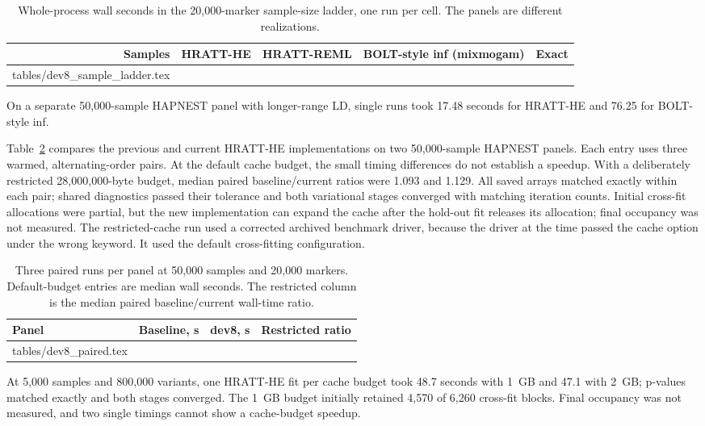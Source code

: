 \documentclass[11pt]{article}
\makeatletter
\newcommand{\tabinput}[1]{\@@input #1 }
\makeatother
\begin{document}
\begin{table}[htbp]
 \centering\small
 \caption{Whole-process wall seconds in the 20,000-marker sample-size
 ladder, one run per cell. The panels are different realizations.}
 \label{tab:dev8-ladder}
 \begin{tabular}{@{}rrrrr@{}}
 \toprule
 Samples & HRATT-HE & HRATT-REML & BOLT-style inf (mixmogam) & Exact \\
 \midrule
 \tabinput{tables/dev8_sample_ladder.tex}
 \bottomrule
 \end{tabular}
\end{table}

On a separate 50,000-sample HAPNEST panel with longer-range LD, single
runs took 17.48 seconds for HRATT-HE and 76.25 for BOLT-style inf.

Table~\ref{tab:dev8-paired} compares the previous and current HRATT-HE
implementations on two 50,000-sample HAPNEST panels. Each entry uses three
warmed, alternating-order pairs. At the default cache budget, the small
timing differences do not establish a speedup. With a deliberately
restricted 28,000,000-byte budget, median paired baseline/current ratios
were 1.093 and 1.129. All saved arrays matched exactly within each pair;
shared diagnostics passed their tolerance and both variational stages
converged with matching iteration counts. Initial cross-fit allocations
were partial, but the new implementation can expand the cache after the
hold-out fit releases its allocation; final occupancy was not measured.
The restricted-cache run used a corrected archived benchmark driver,
because the driver at the time passed the cache option under the wrong
keyword. It used the default cross-fitting configuration.

\begin{table}[htbp]
 \centering\small
 \caption{Three paired runs per panel at 50,000 samples and 20,000
 markers. Default-budget entries are median wall seconds. The restricted
 column is the median paired baseline/current wall-time ratio.}
 \label{tab:dev8-paired}
 \begin{tabular}{@{}lrrr@{}}
 \toprule
 Panel & Baseline, s & dev8, s & Restricted ratio \\
 \midrule
 \tabinput{tables/dev8_paired.tex}
 \bottomrule
 \end{tabular}
\end{table}

At 5,000 samples and 800,000 variants, one HRATT-HE fit per cache budget
took 48.7 seconds with 1~GB and 47.1 with 2~GB; p-values matched exactly
and both stages converged. The 1~GB budget initially retained 4,570 of
6,260 cross-fit blocks. Final occupancy was not measured, and two single
timings cannot show a cache-budget speedup.
\end{document}
